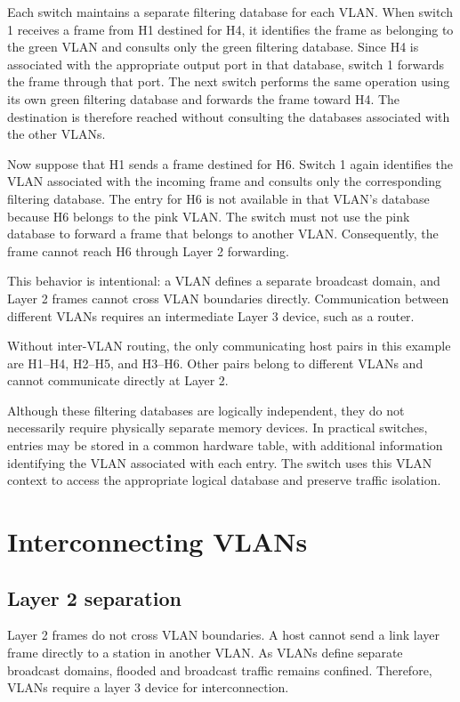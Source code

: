 \documentclass[11pt,a4paper,openany]{report}
\begin{document}
Each switch maintains a separate filtering database for each VLAN. When switch 1 receives a frame from H1 destined for H4, it identifies the frame as belonging to the green VLAN and consults only the green filtering database. Since H4 is associated with the appropriate output port in that database, switch 1 forwards the frame through that port. The next switch performs the same operation using its own green filtering database and forwards the frame toward H4. The destination is therefore reached without consulting the databases associated with the other VLANs.

Now suppose that H1 sends a frame destined for H6. Switch 1 again identifies the VLAN associated with the incoming frame and consults only the corresponding filtering database. The entry for H6 is not available in that VLAN's database because H6 belongs to the pink VLAN. The switch must not use the pink database to forward a frame that belongs to another VLAN. Consequently, the frame cannot reach H6 through Layer 2 forwarding.

This behavior is intentional: a VLAN defines a separate broadcast domain, and Layer 2 frames cannot cross VLAN boundaries directly. Communication between different VLANs requires an intermediate Layer 3 device, such as a router.

Without inter-VLAN routing, the only communicating host pairs in this example are H1–H4, H2–H5, and H3–H6. Other pairs belong to different VLANs and cannot communicate directly at Layer 2.

Although these filtering databases are logically independent, they do not necessarily require physically separate memory devices. In practical switches, entries may be stored in a common hardware table, with additional information identifying the VLAN associated with each entry. The switch uses this VLAN context to access the appropriate logical database and preserve traffic isolation.

\section{Interconnecting VLANs}

\subsection{Layer 2 separation}

Layer 2 frames do not cross VLAN boundaries. A host cannot send a link layer frame directly to a station in another VLAN. As VLANs define separate broadcast domains, flooded and broadcast traffic remains confined. Therefore, VLANs require a layer 3 device for interconnection.
\end{document}
